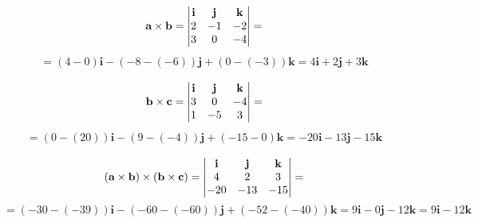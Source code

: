 \documentclass{article}
\begin{document}
\begin{equation*}
    \textbf{a} \times \textbf{b} =  \mdet{\textbf{i} & \textbf{j} & \textbf{k}\\ 2 & -1 & -2 \\ 3 & 0 & -4} =
\end{equation*}
\begin{eqnarray}
    = (4 - 0)\textbf{i} - (-8 - (-6))\textbf{j} + (0 - (-3))\textbf{k} = 4\textbf{i} + 2\textbf{j} + 3\textbf{k}
\end{eqnarray}

\begin{equation*}
    \textbf{b} \times \textbf{c} =  \mdet{\textbf{i} & \textbf{j} & \textbf{k}\\ 3 & 0 & -4 \\ 1 & -5 & 3} =
\end{equation*}
\begin{eqnarray}
    = (0 - (20))\textbf{i} - (9 - (-4))\textbf{j} + (-15 - 0)\textbf{k} = -20\textbf{i} -13\textbf{j}  -15\textbf{k}
\end{eqnarray}

\begin{equation*}
    (\textbf{a} \times \textbf{b}) \times (\textbf{b} \times \textbf{c}) =  \mdet{\textbf{i} & \textbf{j} & \textbf{k}\\ 4 & 2 & 3 \\ -20 & -13 & -15} =
\end{equation*}
\begin{equation*}
    = (-30 - (-39))\textbf{i} - (-60 - (-60))\textbf{j} + (-52 - (-40))\textbf{k} = 9\textbf{i} - 0\textbf{j}  -12\textbf{k} = 9\textbf{i} -12\textbf{k} 
\end{equation*}
\end{document}
